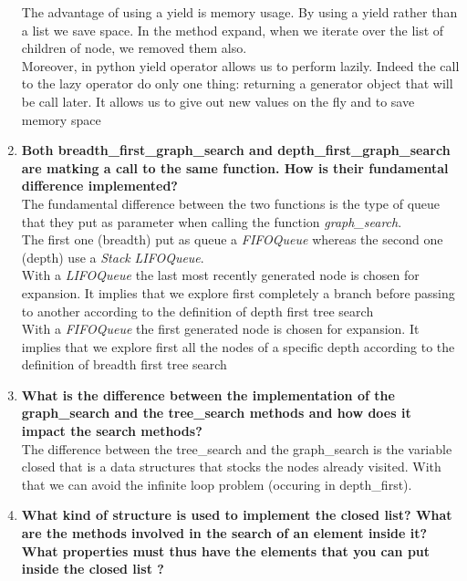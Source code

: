 \documentclass[10pt,a4paper]{article}
\begin{document}
\begin{enumerate}
	The advantage of using a yield is memory usage. By using a yield rather than a list we save space. In the method expand, when we iterate over the list of children of node, we removed them also.\\
	Moreover, in python yield operator allows us to perform lazily. Indeed the call to the lazy operator do only one thing: returning a generator object that will be call later. It allows us to give out new values on the fly and to save memory space
	
	
	\item \textbf{Both breadth\_first\_graph\_search and depth\_first\_graph\_search are matking a call to the same function. How is their fundamental difference implemented?} \\
	
	The fundamental difference between the two functions is the type of queue that they put as parameter when calling the function \textit{graph\_search}.\\
	The first one (breadth) put as queue a \textit{FIFOQueue} whereas the second one (depth) use a \textit{Stack} \textit{LIFOQueue}.\\
	With a \textit{LIFOQueue} the last most recently generated node is chosen for expansion. It implies that we explore first completely a branch before passing to another according to the definition of depth first tree search \\
	With a \textit {FIFOQueue} the first generated node is chosen for expansion. It implies that  we explore first all the nodes of a specific depth according to the definition of breadth first tree search
	
	
	\item \textbf{What is the difference between the implementation of the graph\_search and the tree\_search methods and how does it impact the search methods?}\\
	
	The difference between the tree\_search and the graph\_search is the variable closed that is a data structures that stocks the nodes already visited. With that we can avoid the infinite loop problem (occuring in depth\_first). 
	
	\item \textbf{What kind of structure is used to implement the closed list? What are the methods involved in the search of an element inside it? What properties must thus have the elements that you can put inside the closed list ?} \\
	

\end{enumerate}
\end{document}
